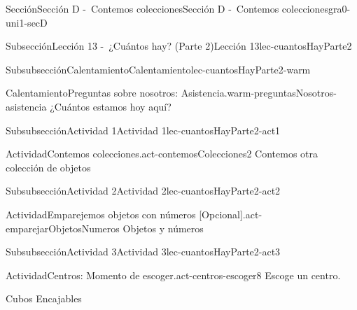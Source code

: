 \documentclass[twoside,10pt,]{article}
\begin{document}
\begin{sectionptx}{Sección}{Sección D -~Contemos colecciones}{}{Sección D -~Contemos colecciones}{}{}{gra0-uni1-secD}
\begin{subsectionptx}{Subsección}{Lección 13 -~¿Cuántos hay? (Parte 2)}{}{Lección 13}{}{}{lec-cuantosHayParte2}
\begin{subsubsectionptx}{Subsubsección}{Calentamiento}{}{Calentamiento}{}{}{lec-cuantosHayParte2-warm}
\begin{exploration}{Calentamiento}{Preguntas sobre nosotros: Asistencia.}{warm-preguntasNosotros-asistencia}
¿Cuántos estamos hoy aquí?%
\end{exploration}%
\end{subsubsectionptx}
%
%
\typeout{************************************************}
\typeout{************************************************}
%
\begin{subsubsectionptx}{Subsubsección}{Actividad 1}{}{Actividad 1}{}{}{lec-cuantosHayParte2-act1}
\begin{activity}{Actividad}{Contemos colecciones.}{act-contemosColecciones2}%
Contemos otra colección de objetos%
\end{activity}%
\end{subsubsectionptx}
%
%
\typeout{************************************************}
\typeout{************************************************}
%
\begin{subsubsectionptx}{Subsubsección}{Actividad 2}{}{Actividad 2}{}{}{lec-cuantosHayParte2-act2}
\begin{activity}{Actividad}{Emparejemos objetos con números [Opcional].}{act-emparejarObjetosNumeros}%
Objetos y números%
\end{activity}%
\end{subsubsectionptx}
%
%
\typeout{************************************************}
\typeout{************************************************}
%
\begin{subsubsectionptx}{Subsubsección}{Actividad 3}{}{Actividad 3}{}{}{lec-cuantosHayParte2-act3}
\begin{activity}{Actividad}{Centros: Momento de escoger.}{act-centros-escoger8}%
Escoge un centro.%
\begin{sidebyside}{2}{0.025}{0.025}{0.05}%
\begin{sbspanel}{0.45}%
Cubos Encajables%
\par

\end{sbspanel}
\end{sidebyside}
\end{activity}
\end{subsubsectionptx}
\end{subsectionptx}
\end{sectionptx}
\end{document}
